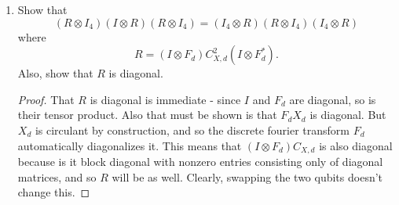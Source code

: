 \documentclass{article}
\begin{document}
\begin{enumerate}
\begin{proof}
      Since $A^{20} = 1,$ by lemma 14.3 and linearity \[\langle \mu\omega\rangle = \dfrac{-\mu\overline G}{2A^{-28}(A^2-A^{-2})}\]
      with $G = \sum_{n=1}^{20}A^{n^2}.$ For $r=5$, we also have that \[\omega = \sum_{n=0}^{r-2}\Delta_nS_n(\alpha) =\Delta_0 + \Delta_1\alpha + \Delta_2(\alpha^2-1) + \Delta_3(\alpha^3-2\alpha)\]
      or rearranging terms:
      \[\omega = \Delta_0\alpha^0 + (\Delta_1-2\Delta_3)\alpha^1 + \Delta_2\alpha^2+\Delta_3\alpha^3.\]
      We then calculate $\langle\mu\omega\rangle_{3_1}$ linearly. First, $\langle \mu\Delta_0\alpha^0\rangle = 0$ as the empty diagram. Similarly, $\mu(\Delta_1-2\Delta_3)\langle\alpha\rangle = \mu(\Delta_1-2\Delta_3)\langle 3_1\rangle$ the Kaufman bracket of $3_1.$ This is known to be given by $\langle 3_1 \rangle = -A^5-A^{-3}-A^{-7}.$
      \end{proof}
    \item Show that \[(R\otimes I_4)(I\otimes R)(R\otimes I_4) = (I_4\otimes R)(R\otimes I_4)(I_4\otimes R)\] where \[R = (I\otimes F_d)C_{X,d}^2(I\otimes F^*_d).\]
      Also, show that $R$ is diagonal. 
      \begin{proof}
        That $R$ is diagonal is immediate - since $I$ and $F_d$ are diagonal, so is their tensor product. Also that must be shown is that $F_dX_d$ is diagonal. But $X_d$ is circulant by construction, and so the discrete fourier transform $F_d$ automatically diagonalizes it. This means that $(I\otimes F_d)C_{X,d}$ is also diagonal because is it block diagonal with nonzero entries consisting only of diagonal matrices, and so $R$ will be as well. Clearly, swapping the two qubits doesn't change this.\smallskip


\end{proof}
\end{enumerate}
\end{document}
